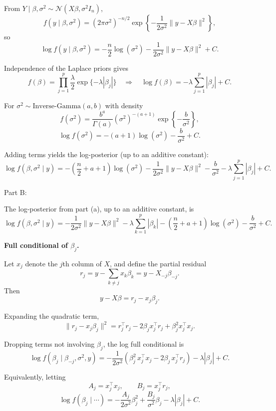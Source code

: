 \documentclass[hidelinks]{article}
\begin{document}
\noindent From $Y\mid \beta,\sigma^2\sim \mathcal N(X\beta,\sigma^2 I_n)$,
\[
f(y\mid \beta,\sigma^2)=(2\pi\sigma^2)^{-n/2}\exp\!\left\{-\frac{1}{2\sigma^2}\|y-X\beta\|^2\right\},
\]
so
\[
\log f(y\mid \beta,\sigma^2)= -\frac{n}{2}\log(\sigma^2)-\frac{1}{2\sigma^2}\|y-X\beta\|^2 + C.
\]

\noindent Independence of the Laplace priors gives
\[
f(\beta)=\prod_{j=1}^p \frac{\lambda}{2}\exp\{-\lambda|\beta_j|\}
\quad\Rightarrow\quad
\log f(\beta)= -\lambda\sum_{j=1}^p|\beta_j| + C.
\]

\noindent For $\sigma^2\sim \text{Inverse-Gamma}(a,b)$ with density
\[
f(\sigma^2)=\frac{b^a}{\Gamma(a)}(\sigma^2)^{-(a+1)}\exp\!\left\{-\frac{b}{\sigma^2}\right\},
\]
\[
\log f(\sigma^2)=-(a+1)\log(\sigma^2)-\frac{b}{\sigma^2}+C.
\]

\noindent Adding terms yields the log-posterior (up to an additive constant):
\[
\boxed{
\log f(\beta,\sigma^2\mid y)
=
-\left(\frac{n}{2}+a+1\right)\log(\sigma^2)
-\frac{1}{2\sigma^2}\|y-X\beta\|^2
-\frac{b}{\sigma^2}
-\lambda\sum_{j=1}^p|\beta_j|
+ C.}
\]

\noindent Part B:

\noindent The log-posterior from part (a), up to an additive constant, is
\[
\log f(\beta,\sigma^2 \mid y)
=
-\frac{1}{2\sigma^2}\|y - X\beta\|^2
-\lambda \sum_{k=1}^p |\beta_k|
-\left(\frac{n}{2}+a+1\right)\log(\sigma^2)
-\frac{b}{\sigma^2}
+ C.
\]

\medskip

\noindent \textbf{Full conditional of $\beta_j$.}

\noindent Let $x_j$ denote the $j$th column of $X$, and define the partial residual
\[
r_j = y - \sum_{k\neq j} x_k \beta_k
= y - X_{-j}\beta_{-j}.
\]
\noindent Then
\[
y - X\beta = r_j - x_j \beta_j.
\]

\noindent Expanding the quadratic term,
\[
\|r_j - x_j\beta_j\|^2
= r_j^\top r_j
- 2\beta_j x_j^\top r_j
+ \beta_j^2 x_j^\top x_j.
\]

\noindent Dropping terms not involving $\beta_j$, the log full conditional is
\[
\boxed{
\log f(\beta_j \mid \beta_{-j},\sigma^2,y)
=
-\frac{1}{2\sigma^2}
\left(
\beta_j^2\, x_j^\top x_j
- 2\beta_j\, x_j^\top r_j
\right)
-\lambda |\beta_j|
+ C.
}
\]

\noindent Equivalently, letting
\[
A_j = x_j^\top x_j,
\qquad
B_j = x_j^\top r_j,
\]
\[
\log f(\beta_j \mid \cdots)
=
-\frac{A_j}{2\sigma^2}\beta_j^2
+\frac{B_j}{\sigma^2}\beta_j
-\lambda|\beta_j|
+ C.
\]

\medskip
\end{document}
